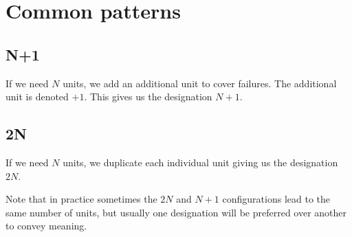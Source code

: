 \documentclass{pgnotes}
\begin{document}
\section{Common patterns}

\subsection{N+1}

If we need $N$ units, we add an additional unit to cover failures.
The additional unit is denoted $+1$.
This gives us the designation $N+1$.

\subsection{2N}

If we need $N$ units, we duplicate each individual unit giving us the designation $2N$.

Note that in practice sometimes the $2N$ and $N+1$ configurations lead to the same number of units, but usually one designation will be preferred over another to convey meaning. 
\end{document}
